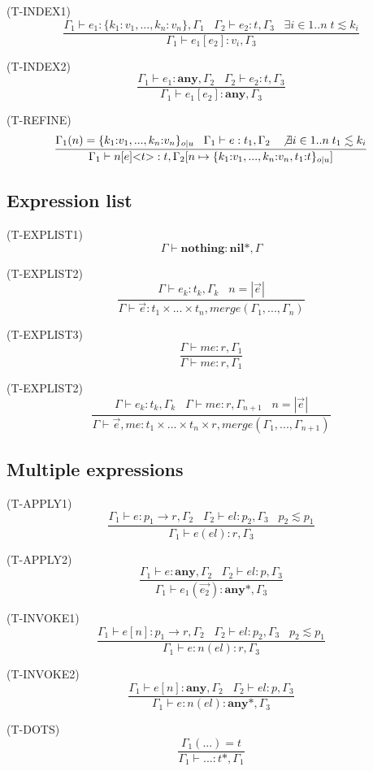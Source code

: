 \documentclass{paper}
\newcommand{\Any}{\mathbf{any}}
\newcommand{\Nil}{\mathbf{nil}}
\newcommand{\mylabel}[1]{\; (\textsc{#1})}
\newcommand{\env}{\Gamma}
\begin{document}
\mylabel{T-INDEX1}
\[
\dfrac{\env_{1} \vdash e_{1}:\{k_{1}{:}v_{1}, ..., k_{n}{:}v_{n}\}, \env_{1} \;\;\;
       \env_{2} \vdash e_{2}:t, \env_{3} \;\;\;
       \exists i \in 1{..}n \; t \lesssim k_{i}}
      {\env_{1} \vdash e_{1}[e_{2}]:v_{i}, \env_{3}}
\]

\mylabel{T-INDEX2}
\[
\dfrac{\env_{1} \vdash e_{1}:\Any, \env_{2} \;\;\;
       \env_{2} \vdash e_{2}:t, \env_{3}}
      {\env_{1} \vdash e_{1}[e_{2}]:\Any, \env_{3}}
\]

\mylabel{T-REFINE}
\[
\dfrac{\env_{1}(n) = \{ k_{1}{:}v_{1}, ..., k_{n}{:}v_{n} \}_{o|u} \;\;\;
       \env_{1} \vdash e:t_{1}, \env_{2} \;\;\;
       \not \exists i \in 1..n \; t_{1} \lesssim k_{i}}
      {\env_{1} \vdash n[e] {<}t{>}:t, \env_{2}[n \mapsto \{ k_{1}{:}v_{1}, ..., k_{n}{:}v_{n}, t_{1}{:}t\}_{o|u}]}
\]

\subsection{Expression list}

\noindent

\mylabel{T-EXPLIST1}
\[
\env \vdash \mathbf{nothing}:\Nil{*}, \env
\]

\mylabel{T-EXPLIST2}
\[
\dfrac{\env \vdash e_{k}:t_{k}, \env_{k} \;\;\;
       n = |\vec{e}|}
      {\env \vdash \vec{e}:t_{1} \times ... \times t_{n}, merge(\env_{1}, ..., \env_{n})}
\]

\mylabel{T-EXPLIST3}
\[
\dfrac{\env \vdash me:r, \env_{1}}
      {\env \vdash me:r, \env_{1}}
\]

\mylabel{T-EXPLIST2}
\[
\dfrac{\env \vdash e_{k}:t_{k}, \env_{k} \;\;\;
       \env \vdash me:r, \env_{n + 1} \;\;\;
       n = |\vec{e}|}
      {\env \vdash \vec{e}, me:t_{1} \times ... \times t_{n} \times r, merge(\env_{1}, ..., \env_{n+1})}
\]

\subsection{Multiple expressions}

\noindent

\mylabel{T-APPLY1}
\[
\dfrac{\env_{1} \vdash e:p_{1} \rightarrow r, \env_{2} \;\;\;
       \env_{2} \vdash el:p_{2}, \env_{3} \;\;\;
       p_{2} \lesssim p_{1}}
      {\env_{1} \vdash e(el):r, \env_{3}}
\]

\mylabel{T-APPLY2}
\[
\dfrac{\env_{1} \vdash e:\Any, \env_{2} \;\;\;
       \env_{2} \vdash el:p, \env_{3}}
      {\env_{1} \vdash e_{1}(\vec{e_{2}}):\Any{*}, \env_{3}}
\]

\mylabel{T-INVOKE1}
\[
\dfrac{\env_{1} \vdash e[n]:p_{1} \rightarrow r, \env_{2} \;\;\;
       \env_{2} \vdash el:p_{2}, \env_{3} \;\;\;
       p_{2} \lesssim p_{1}}
      {\env_{1} \vdash e{:}n(el):r, \env_{3}}
\]

\mylabel{T-INVOKE2}
\[
\dfrac{\env_{1} \vdash e[n]:\Any, \env_{2} \;\;\;
       \env_{2} \vdash el:p, \env_{3}}
      {\env_{1} \vdash e{:}n(el):\Any{*}, \env_{3}}
\]

\mylabel{T-DOTS}
\[
\dfrac{\env_{1}({...}) = t}
      {\env_{1} \vdash {...}:t{*}, \env_{1}}
\]
\end{document}
